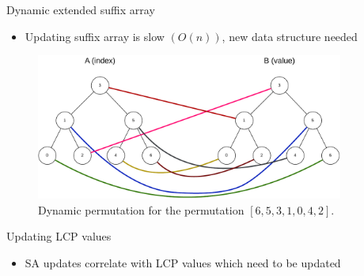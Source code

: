 \documentclass[aspectratio=1610, xcolor=table]{beamer}
\begin{document}
\begin{frame}[fragile]{Dynamic extended suffix array}
    \begin{itemize}
        \item Updating suffix array is slow $(O(n))$, new data structure needed
    \end{itemize}
	\begin{figure}[t]
		\begin{center}
			\includegraphics[width=0.9\textwidth]{figures/dynamicpermutation2.drawio.pdf}
		\end{center}
		\caption{Dynamic permutation for the permutation $[6,5,3,1,0,4,2]$.}
		\label{fig:dynamicpermutation}
	\end{figure}
\end{frame}

\begin{frame}[fragile]{Updating LCP values}
    \begin{itemize}
        \item SA updates correlate with LCP values which need to be updated
    \end{itemize}
    \begin{table}[t]
	\begin{center}
	\end{center}
	\label{tab:lcpupdates}
\end{table}
\end{frame}
\end{document}
